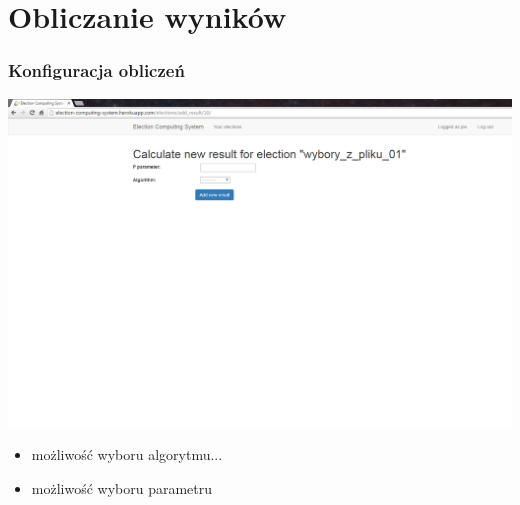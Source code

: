 \documentclass{beamer}
\begin{document}
\section{Obliczanie wyników}
\begin{frame}
\frametitle{Konfiguracja obliczeń}
\includegraphics[height=0.5\paperheight]{screenshots/12_add_new_result.png}
\begin{itemize}
\item możliwość wyboru algorytmu...
\item możliwość wyboru parametru
\end{itemize}
\end{frame}
\end{document}
